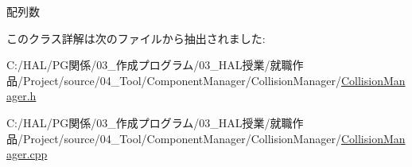 配列数 



このクラス詳解は次のファイルから抽出されました\+:\begin{DoxyCompactItemize}
\item 
C\+:/\+H\+A\+L/\+P\+G関係/03\+\_\+作成プログラム/03\+\_\+\+H\+A\+L授業/就職作品/\+Project/source/04\+\_\+\+Tool/\+Component\+Manager/\+Collision\+Manager/\mbox{\hyperlink{_collision_manager_8h}{Collision\+Manager.\+h}}\item 
C\+:/\+H\+A\+L/\+P\+G関係/03\+\_\+作成プログラム/03\+\_\+\+H\+A\+L授業/就職作品/\+Project/source/04\+\_\+\+Tool/\+Component\+Manager/\+Collision\+Manager/\mbox{\hyperlink{_collision_manager_8cpp}{Collision\+Manager.\+cpp}}\end{DoxyCompactItemize}
